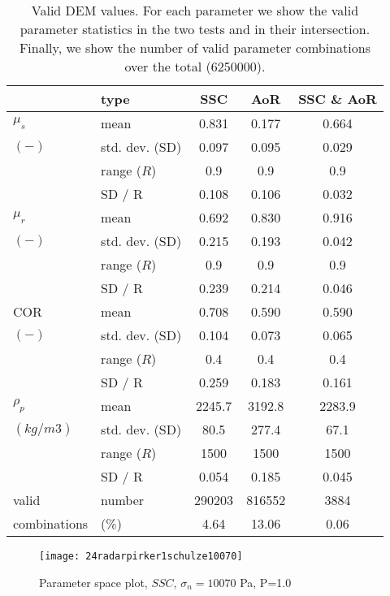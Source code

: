 \documentclass{CFD2015}
\begin{document}
\begin{table*}%
\centering
\begin{tabular}{llccc}
\hline

          & type  & SSC & AoR   & SSC \& AoR \\
          \hline

    $\mu_s$ & mean  & 0.831 & 0.177 & 0.664 \\
    $(-)$   & std. dev. (SD) & 0.097 & 0.095 & 0.029 \\
          & range ($R$) & 0.9   & 0.9   & 0.9 \\
          & SD / R & 0.108 & 0.106 & 0.032 \\
          \hline
    $\mu_r$ & mean  & 0.692 & 0.830 & 0.916 \\
    $(-)$   & std. dev. (SD) & 0.215 & 0.193 & 0.042 \\
          & range ($R$) & 0.9   & 0.9   & 0.9 \\
          & SD / R & 0.239 & 0.214 & 0.046 \\
          \hline
              COR   & mean  & 0.708 & 0.590 & 0.590 \\
    $(-)$   & std. dev. (SD) & 0.104 & 0.073 & 0.065 \\
          & range ($R$) & 0.4   & 0.4   & 0.4 \\
          & SD / R & 0.259 & 0.183 & 0.161 \\
          \hline
    $\rho_p$ & mean  & 2245.7 & 3192.8 & 2283.9 \\
    $(kg/m3)$ & std. dev. (SD) & 80.5  & 277.4 & 67.1 \\
          & range ($R$) & 1500  & 1500  & 1500 \\
          & SD / R & 0.054 & 0.185 & 0.045 \\
          \hline
    valid & number & 290203 & 816552 & 3884 \\
    combinations & (\%) & 4.64  & 13.06 & 0.06 \\  

\hline
\end{tabular}
\caption[Valid DEM values]{Valid DEM values. For each parameter we show the
valid parameter statistics in the two tests and in their intersection.
Finally, we show the number of valid parameter combinations over the total
(6250000).}
\label{tab:13DEMvalidvalues}
\end{table*}
\begin{figure}%
\centering 
\texttt{[image: 24radarpirker1schulze10070]} 
\caption{Parameter space plot, $SSC$, $\sigma_n=10070$ Pa, P=1.0}
\label{fig:24radarpirker1schulze10070} 
\end{figure}
\end{document}
